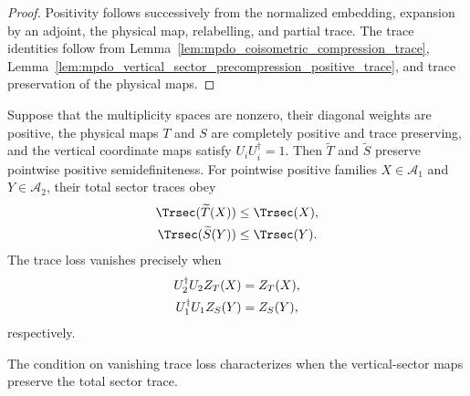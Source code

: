 \begin{proof}\leanok
    Positivity follows successively from the normalized embedding, expansion
    by an adjoint, the physical map, relabelling, and partial trace. The trace
    identities follow from Lemma~\ref{lem:mpdo_coisometric_compression_trace},
    Lemma~\ref{lem:mpdo_vertical_sector_precompression_positive_trace}, and
    trace preservation of the physical maps.
\end{proof}

\begin{lemma}
    \label{thm:mpdo_transported_vertical_sector_trace_loss}
    \leanok
    Suppose that the multiplicity spaces are nonzero, their diagonal weights
    are positive, the physical maps $T$ and $S$ are completely positive and
    trace preserving, and the vertical coordinate maps satisfy
    $U_iU_i^\dagger=1$. Then $\widetilde T$ and $\widetilde S$ preserve
    pointwise positive semidefiniteness. For pointwise positive families
    $X\in\mathcal A_1$ and $Y\in\mathcal A_2$, their total sector traces obey
    \begin{align}
        \Trsec(\widetilde T(X))
         & \leq \Trsec(X),
        \notag             \\
        \Trsec(\widetilde S(Y))
         & \leq \Trsec(Y).
        \notag
    \end{align}
    The trace loss vanishes precisely when
    \begin{align}
        U_2^\dagger U_2 Z_T(X)
         & =Z_T(X),
        \notag      \\
        U_1^\dagger U_1 Z_S(Y)
         & =Z_S(Y),
        \notag
    \end{align}
    respectively.

    The condition on vanishing trace loss characterizes when the vertical-sector
    maps preserve the total sector trace.
\end{lemma}

